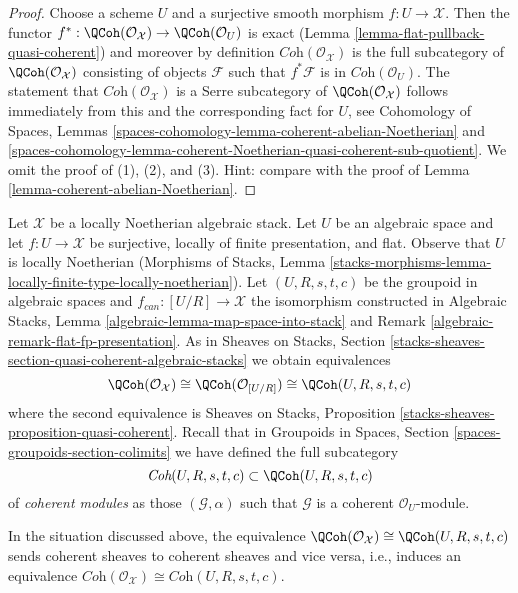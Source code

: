\begin{proof}
Choose a scheme $U$ and a surjective smooth morphism $f : U \to \mathcal{X}$.
Then the functor
$f^* : \QCoh(\mathcal{O}_\mathcal{X}) \to \QCoh(\mathcal{O}_U)$
is exact (Lemma \ref{lemma-flat-pullback-quasi-coherent})
and moreover by definition $\textit{Coh}(\mathcal{O}_\mathcal{X})$
is the full subcategory of $\QCoh(\mathcal{O}_\mathcal{X})$ consisting
of objects $\mathcal{F}$ such that $f^*\mathcal{F}$ is in
$\textit{Coh}(\mathcal{O}_U)$. The statement that
$\textit{Coh}(\mathcal{O}_\mathcal{X})$ is a Serre subcategory of
$\QCoh(\mathcal{O}_\mathcal{X})$ follows immediately from this
and the corresponding fact for $U$, see
Cohomology of Spaces, Lemmas
\ref{spaces-cohomology-lemma-coherent-abelian-Noetherian} and
\ref{spaces-cohomology-lemma-coherent-Noetherian-quasi-coherent-sub-quotient}.
We omit the proof of (1), (2), and (3). Hint: compare
with the proof of Lemma \ref{lemma-coherent-abelian-Noetherian}.
\end{proof}

\noindent
Let $\mathcal{X}$ be a locally Noetherian algebraic stack.
Let $U$ be an algebraic space and let $f : U \to \mathcal{X}$
be surjective, locally of finite presentation, and flat.
Observe that $U$ is locally Noetherian
(Morphisms of Stacks, Lemma
\ref{stacks-morphisms-lemma-locally-finite-type-locally-noetherian}).
Let $(U, R, s, t, c)$ be the groupoid in algebraic spaces
and $f_{can} : [U/R] \to \mathcal{X}$ the isomorphism
constructed in
Algebraic Stacks, Lemma \ref{algebraic-lemma-map-space-into-stack} and
Remark \ref{algebraic-remark-flat-fp-presentation}.
As in Sheaves on Stacks, Section
\ref{stacks-sheaves-section-quasi-coherent-algebraic-stacks}
we obtain equivalences
$$
\QCoh(\mathcal{O}_\mathcal{X})
\cong
\QCoh(\mathcal{O}_{[U/R]})
\cong
\QCoh(U, R, s, t, c)
$$
where the second equivalence is
Sheaves on Stacks, Proposition \ref{stacks-sheaves-proposition-quasi-coherent}.
Recall that in Groupoids in Spaces, Section
\ref{spaces-groupoids-section-colimits}
we have defined the full subcategory
$$
\textit{Coh}(U, R, s, t, c) \subset \QCoh(U, R, s, t, c)
$$
of {\it coherent modules} as those $(\mathcal{G}, \alpha)$ such that
$\mathcal{G}$ is a coherent $\mathcal{O}_U$-module.

\begin{lemma}
\label{lemma-coherent-presentation}
In the situation discussed above, the equivalence
$\QCoh(\mathcal{O}_\mathcal{X}) \cong \QCoh(U, R, s, t, c)$
sends coherent sheaves to coherent sheaves and vice versa, i.e.,
induces an equivalence
$\textit{Coh}(\mathcal{O}_\mathcal{X}) \cong \textit{Coh}(U, R, s, t, c)$.
\end{lemma}

